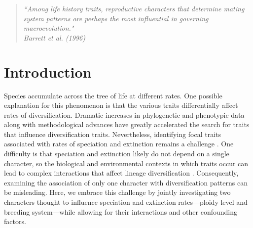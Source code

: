 \begin{quote}
\em{``Among life history traits, reproductive characters that determine mating system patterns are perhaps the most influential in governing macroevolution." 
}
\\
\hspace*{\fill}\rm{ Barrett et al. (1996)}
\end{quote}

\section{Introduction}

Species accumulate across the tree of life at different rates. 
One possible explanation for this phenomenon is that the various traits differentially affect rates of diversification. %
Dramatic increases in phylogenetic and phenotypic data along with methodological advances have greatly accelerated the search for traits that influence diversification traits. 
Nevertheless, identifying focal traits associated with rates of speciation and extinction remains a challenge \citep[\eg][]{maddison_2015, rabosky_2015, beaulieu_2016, rabosky_2017}. 
One difficulty is that speciation and extinction likely do not depend on a single character, so the biological and environmental contexts in which traits occur can lead to complex interactions that affect lineage diversification \citep{beaulieu_2016, caetano_2018, herrera_2018}.
Consequently, examining the association of only one character with diversification patterns can be misleading. 
Here, we embrace this challenge by jointly investigating two characters thought to influence speciation and extinction rates---ploidy level and breeding system---while allowing for their interactions and other confounding factors.

